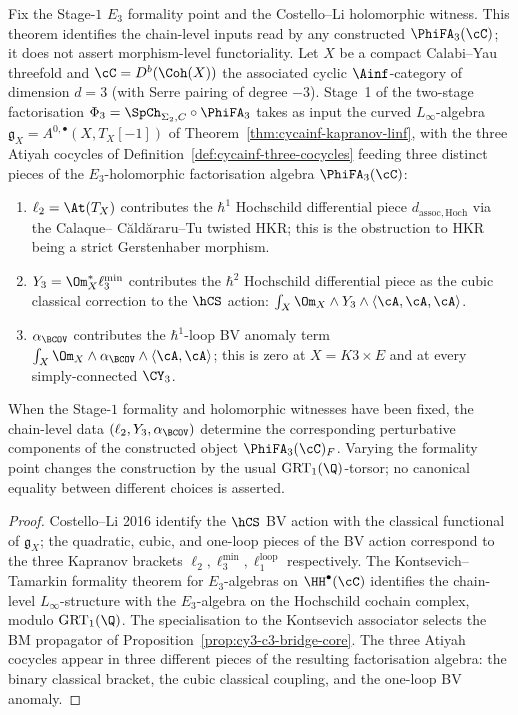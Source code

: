 \begin{theorem}
\label{thm:cycainf-stage-1-three-cocycle-witness}
Fix the Stage-$1$ $E_3$ formality point and the Costello--Li
holomorphic witness. This theorem identifies the
chain-level inputs read by any constructed $\PhiFA_3(\cC)$; it does not
assert morphism-level functoriality.
Let $X$ be a compact Calabi--Yau threefold and $\cC = D^b(\Coh(X))$
the associated cyclic $\Ainf$-category of dimension $d = 3$ (with
Serre pairing of degree $-3$). Stage~1 of the two-stage factorisation
$\Phi_3 = \SpCh_{\Sigma_2, C} \circ \PhiFA_3$ takes as input the
curved $L_\infty$-algebra $\mathfrak g_X = A^{0,\bullet}(X, T_X[-1])$
of Theorem~\ref{thm:cycainf-kapranov-linf}, with the three
Atiyah cocycles of Definition~\ref{def:cycainf-three-cocycles}
feeding three distinct pieces of the $E_3$-holomorphic factorisation
algebra $\PhiFA_3(\cC)$:
\begin{enumerate}
\item $\ell_2 = \At(T_X)$ contributes the $\hbar^1$ Hochschild
differential piece $d_{\mathrm{assoc, Hoch}}$ via the Calaque--
C\u ald\u araru--Tu twisted HKR; this is the obstruction to HKR being
a strict Gerstenhaber morphism.
\item $Y_3 = \Om_X^* \ell_3^{\min}$ contributes the $\hbar^2$
Hochschild differential piece as the cubic classical correction to the
$\hCS$ action: $\int_X \Om_X \wedge Y_3 \wedge \langle \cA, \cA, \cA
\rangle$.
\item $\alpha_{\BCOV}$ contributes the $\hbar^1$-loop BV anomaly term
$\int_X \Om_X \wedge \alpha_{\BCOV} \wedge \langle \cA, \cA \rangle$;
this is zero at $X = K3 \times E$ and at every simply-connected
$\CY_3$.
\end{enumerate}
When the Stage-$1$ formality and holomorphic witnesses have been fixed,
the chain-level data $(\ell_2, Y_3,\alpha_{\BCOV})$ determine the
corresponding perturbative components of the constructed object
$\PhiFA_3(\cC)_F$. Varying the formality point changes the construction
by the usual $\mathrm{GRT}_1(\Q)$-torsor; no canonical equality between
different choices is asserted.
\end{theorem}

\begin{proof}
Costello--Li 2016 identify the $\hCS$ BV action with the classical
functional of $\mathfrak g_X$; the quadratic, cubic, and one-loop
pieces of the BV action correspond to the three Kapranov brackets
$\ell_2, \ell_3^{\min}, \ell_1^{\text{loop}}$ respectively. The
Kontsevich--Tamarkin formality theorem for $E_3$-algebras on $\HH^\bullet
(\cC)$ identifies the chain-level $L_\infty$-structure with the
$E_3$-algebra on the Hochschild cochain complex, modulo
$\mathrm{GRT}_1(\Q)$. The specialisation to the Kontsevich associator
selects the BM propagator of
Proposition~\textup{\ref{prop:cy3-c3-bridge-core}}. The three
Atiyah cocycles appear in three different pieces of the
resulting factorisation algebra: the binary classical bracket, the
cubic classical coupling, and the one-loop BV anomaly.
\end{proof}

